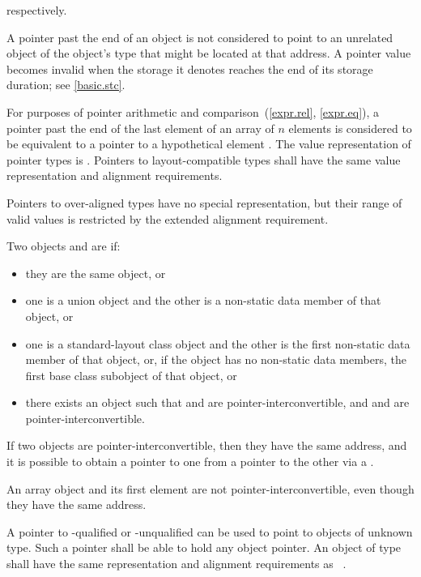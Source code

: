 respectively.
\begin{note}
A pointer past the end of an object
is not considered to point to an unrelated object
of the object's type
that might be located at that address.
A pointer value becomes invalid
when the storage it denotes
reaches the end of its storage duration;
see \ref{basic.stc}.
\end{note}
For purposes of pointer arithmetic
and comparison~(\ref{expr.rel}, \ref{expr.eq}),
a pointer past the end of the last element of
an array  of $n$ elements
is considered to be equivalent to
a pointer to a hypothetical element .
The value representation of
pointer types is . Pointers to
layout-compatible types shall
have the same value representation and alignment
requirements.
\begin{note} Pointers to over-aligned types have no special
representation, but their range of valid values is restricted by the extended
alignment requirement.\end{note}

\pnum
Two objects  and  are  if:
\begin{itemize}
\item
they are the same object, or
\item
one is a union object and
the other is a non-static data member of that object, or
\item
one is a standard-layout class object and
the other is the first non-static data member of that object, or,
if the object has no non-static data members,
the first base class subobject of that object, or
\item
there exists an object  such that
 and  are pointer-interconvertible, and
 and  are pointer-interconvertible.
\end{itemize}
If two objects are pointer-interconvertible,
then they have the same address,
and it is possible to obtain a pointer to one
from a pointer to the other
via a .
\begin{note}
An array object and its first element are not pointer-interconvertible,
even though they have the same address.
\end{note}

\pnum
{}%
%
A pointer to \cv-qualified or \cv-unqualified
can be used to point to objects of
unknown type. Such a pointer shall be able to hold any object pointer.
An object of type \cv{}~
shall have the same representation and alignment
requirements as \cv{}~.

